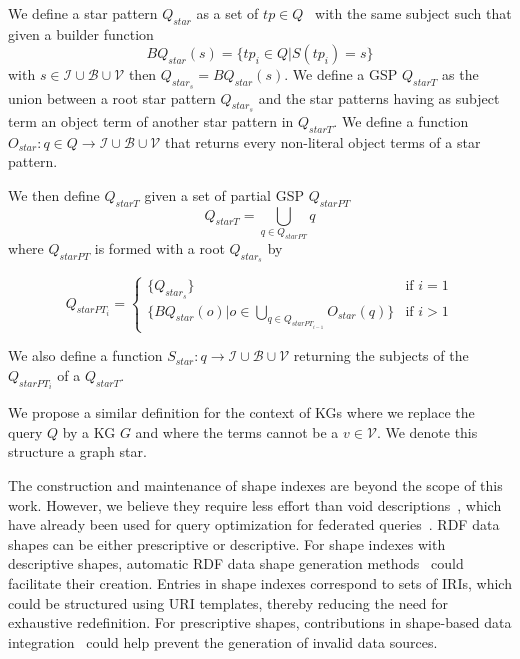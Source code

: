 \begin{definition}\label{def:starPattern}
   We define a star pattern $Q_{star}$ as a set of $tp \in Q$~\cite{Karim2020} with the same subject such that 
   given a builder function 
   \begin{equation}
       BQ_{star}(s) = \{tp_i \in Q| S(tp_i) = s\}
   \end{equation}
   with $s \in \mathcal{I} \cup \mathcal{B} \cup \mathcal{V}$ then $Q_{star_s} = BQ_{star}(s)$.
   We define a GSP $Q_{starT}$ as the union between a root star pattern $Q_{star_s}$
   and the star patterns having as subject term an object term of another star pattern in $Q_{starT}$.
   We define a function 
   $O_{star}: q \in Q \rightarrow  \mathcal{I} \cup \mathcal{B} \cup \mathcal{V}$
   that returns every non-literal object terms of a star pattern.

   We then define $Q_{starT}$ given a  set of partial GSP $Q_{starPT}$
   \begin{equation}
       Q_{starT} = \bigcup_{q \in Q_{starPT}} q
   \end{equation}
   where $Q_{starPT}$ is formed with a root $Q_{star_s}$ by

   \begin{equation}
           Q_{starPT_i} =
       \begin{cases}
           \{Q_{star_s}\} & \text{if } i = 1 \\
           \{BQ_{star}(o)| o \in \bigcup\limits_{q \in Q_{starPT_{i-1}}} O_{star}(q)\} & \text{if } i>1
       \end{cases}
   \end{equation}

   We also define a function  
   $S_{star}: q \rightarrow  \mathcal{I} \cup \mathcal{B} \cup \mathcal{V}$
   returning the subjects of the $Q_{starPT_i}$ of a $Q_{starT}$.

   We propose a similar definition for the context of KGs where we replace the query $Q$ by a KG $G$ and where the terms 
   cannot be a $v \in \mathcal{V}$. 
   We denote this structure a graph star.
   
\end{definition}

The construction and maintenance of shape indexes are beyond the scope of this work.
However, we believe they require less effort than void descriptions~\cite{Boehm2011}, which have already been used for query optimization for federated queries~\cite{Montoya2017}.
RDF data shapes can be either prescriptive or descriptive.
For shape indexes with descriptive shapes, automatic RDF data shape generation methods~\cite{fernandez2023extracting} could facilitate their creation.
Entries in shape indexes correspond to sets of IRIs, which could be structured using URI templates, thereby reducing the need for exhaustive redefinition.
For prescriptive shapes, contributions in shape-based data integration~\cite{LabraGayo2023} could help prevent the generation of invalid data sources.


